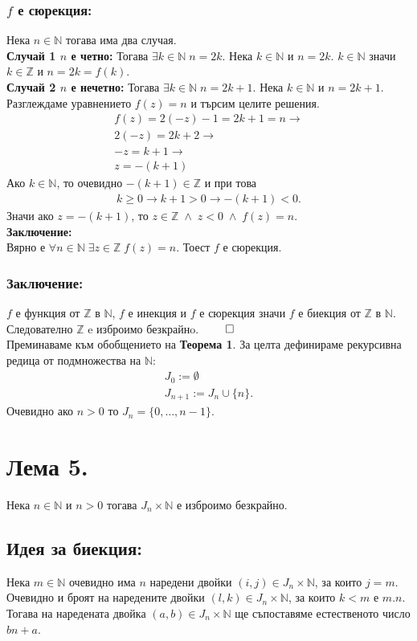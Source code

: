 \documentclass[a4paper, 12pt, oneside]{article}
\newcommand{\N}{\mathbb{N}}
\newcommand{\Z}{\mathbb{Z}}
\begin{document}
\subsubsection*{\(f\) е сюрекция:}
Нека \(n \in \N\) тогава има два случая. \\
\textbf{Случай 1 \(n\) е четно:}
Тогава \(\exists k \in \N \; n = 2k\).
Нека \(k \in \N\) и \(n = 2k\). \(k \in \N\) значи \(k \in \Z\) и \(n = 2k = f(k)\). \\
\textbf{Случай 2 \(n\) е нечетно:}
Тогава \(\exists k \in \N \; n = 2k + 1\).
Нека \(k \in \N\) и \(n = 2k + 1\). 
Разглеждаме уравнението \(f(z) = n\) и търсим целите решения.
\begin{align*}
    f(z) = 2(-z) - 1 = 2k + 1 = n  \longrightarrow \\
    2(-z) = 2k + 2 \longrightarrow \\
    -z = k + 1 \longrightarrow \\
    z = -(k + 1)
\end{align*}
Ако \(k \in \N\), то очевидно \(-(k + 1) \in \Z\) и при това
\begin{align*}
    k \geq 0 \longrightarrow k + 1 > 0 \longrightarrow -(k + 1) < 0.
\end{align*}
Значи ако \(z = -(k + 1)\), то \(z \in \Z \; \land \; z < 0 \; \land \; f(z) = n\). \\
\textbf{Заключение:} \\
Вярно е \(\forall n \in \N \; \exists z \in \Z \; f(z) = n\).
Тоест \(f\) е сюрекция.
\subsubsection*{Заключение:}
\(f\) е функция от \(\Z\)  в \(\N\),  \(f\) е инекция и \(f\) е сюрекция
значи \(f\) е биекция от \(\Z\)  в \(\N\). Следователно \(\Z\) e изброимо безкрайнo. \(\qed\) \\
Преминаваме към обобщението на \textbf{Теорема 1}.
За целта дефинираме рекурсивна редица от подмножества на \(\N\):
\begin{align*}
    J_0 := \emptyset \\
    J_{n + 1} := J_n \cup \{n\}.
\end{align*}
Очевидно ако \(n > 0\) то \(J_n = \{0, \dots, n - 1\}\).
\section*{Лема 5.}
Нека \(n \in \N\) и \(n > 0\) тогава \(J_n \times \N\) е изброимо безкрайно.
\subsection*{Идея за биекция:}
Нека \(m \in \N\) очевидно има \(n\) наредени двойки \((i, j) \in J_n \times \N\), за които \(j = m\).
Очевидно и броят на наредените двойки \((l, k) \in J_n \times \N\), за които \(k < m\) е \(m.n\).
Тогава на наредената двойка \((a, b) \in J_n \times \N\) ще съпоставяме естественото число \(bn + a\). 
\end{document}
